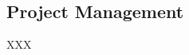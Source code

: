 %
%
%
%
%
%

%
%

\subsection{Project Management}
\label{section:project management}

XXX

\begin{comment}
le systeme de tickets/bugs est egalement tres important. chaque ticket se
voit affecte une priorite et il est important de comprendre que pour le
bien global du projet, un developpeur ne peut se contenter de faire ce
qui lui plait, il se doit de contribuer egalement a la resolution de problemes.

encore une fois les tickets doivent suivre une norme.
\end{comment}
